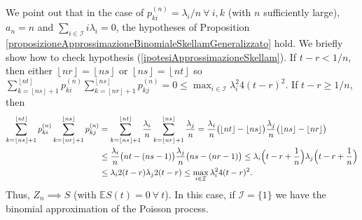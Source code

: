 \documentclass[12pt, twoside, english, headsepline]{article}
\newcommand{\floor}[1]{\left\lfloor #1 \right\rfloor}  %
\theoremstyle{definition} %
\numberwithin{equation}{section} %
\begin{document}
We point out that in the case of $p_{ki}^{(n)} = \lambda_i / n\ \forall\ i,k$ (with $n$ sufficiently large), $a_n = n$ and $\sum_{i\in\mathcal{I}}i\lambda_i = 0$, the hypotheses of Proposition \ref{proposizioneApprossimazioneBinomialeSkellamGeneralizzato} hold. We briefly show how to check hypothesis (\ref{ipotesiApprossimazioneSkellam}). If $t-r< 1/n$, then either $ \floor{n r} = \floor{n s}$ or $\floor{n s} = \floor{n t}$ so $\sum_{k=\floor{n s}+1}^{\floor{n t}}p_{ki}^{(n)}\sum_{k=\floor{n r}+1}^{\floor{n s}}p_{kj}^{(n)} = 0\le\max_{i\in\mathcal{I}}\lambda_i^2 4(t-r)^2$. If $t-r\ge1/n$, then
\begin{align*}
\sum_{k=\floor{n s}+1}^{\floor{n t}}p_{ki}^{(n)}\sum_{k=\floor{n r}+1}^{\floor{n s}}p_{kj}^{(n)}& =  \sum_{k=\floor{n s}+1}^{\floor{n t}} \frac{\lambda_i}{n}\sum_{k=\floor{n r}+1}^{\floor{n s}} \frac{\lambda_j}{n} = \frac{\lambda_i}{n}\bigl(\floor{n t} - \floor{n s}\bigr) \frac{\lambda_j}{n}\bigl(\floor{n s} - \floor{n r}\bigr) \\
&\le  \frac{\lambda_i}{n}\bigl(n t - (n s-1)\bigr)\frac{\lambda_j}{n}\bigl(n s - (n r-1)\bigr) \le \lambda_i\Bigl(t-r+\frac{1}{n}\Bigr) \lambda_j\Bigl(t-r+\frac{1}{n}\Bigr) \\
&\le \lambda_i 2(t-r)\lambda_j 2 (t-r)  \le \max_{i\in\mathcal{I}}\lambda_i^2 4(t-r)^2.
\end{align*}
Thus, $Z_n\implies S$ (with $\mathbb{E}S(t) = 0\ \forall\ t$). In this case, if $\mathcal{I} = \{1\}$ we have the binomial approximation of the Poisson process.
\end{document}
